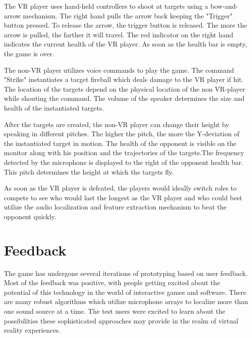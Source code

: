 \documentclass[convention]{aesconf}
\begin{document}
The VR player uses hand-held controllers to shoot at targets using a bow-and-arrow mechanism. The right hand pulls the arrow back keeping the "Trigger" button pressed. To release the arrow, the trigger button is released. The more the arrow is pulled, the farther it will travel. The red indicator on the right hand indicates the current health of the VR player. As soon as the health bar is empty, the game is over.

The non-VR player utilizes voice commands to play the game. The command "Strike" instantiates a target fireball which deals damage to the VR player if hit. The location of the targets depend on the physical location of the non VR-player while shouting the command. The volume of the speaker determines the size and health of the instantiated targets.

After the targets are created, the non-VR player can change their height by speaking in different pitches. The higher the pitch, the more the Y-deviation of the instantiated target in motion. The health of the opponent is visible on the monitor along with his position and the trajectories of the targets.The frequency detected by the microphone is displayed to the right of the opponent health bar. This pitch determines the height at which the targets fly.

As soon as the VR player is defeated, the players would ideally switch roles to compete to see who would last the longest as the VR player and who could best utilize the audio localization and feature extraction mechanism to beat the opponent quickly.

\section{Feedback} 
The game has undergone several iterations of prototyping based on user feedback. Most of the feedback was positive, with people getting excited about the potential of this technology in the world of interactive games and software. There are many robust algorithms which utilize microphone arrays to localize more than one sound source at a time. The test users were excited to learn about the possibilities these sophisticated approaches may provide in the realm of virtual reality experiences.
\end{document}
